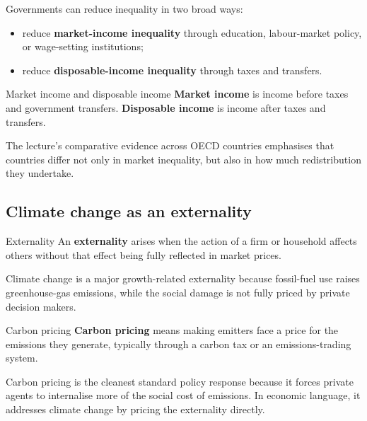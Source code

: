 \documentclass[12pt]{article}
\begin{document}
Governments can reduce inequality in two broad ways:
\begin{itemize}[leftmargin=1.5em]
\item reduce \textbf{market-income inequality} through education, labour-market policy, or wage-setting institutions;
\item reduce \textbf{disposable-income inequality} through taxes and transfers.
\end{itemize}

\begin{definition}{Market income and disposable income}{}
\textbf{Market income} is income before taxes and government transfers.  
\textbf{Disposable income} is income after taxes and transfers.
\end{definition}

The lecture's comparative evidence across OECD countries emphasises that countries differ not only in market inequality, but also in how much redistribution they undertake.

\subsection{Climate change as an externality}

\begin{definition}{Externality}{}
An \textbf{externality} arises when the action of a firm or household affects others without that effect being fully reflected in market prices.
\end{definition}

Climate change is a major growth-related externality because fossil-fuel use raises greenhouse-gas emissions, while the social damage is not fully priced by private decision makers.

\begin{definition}{Carbon pricing}{}
\textbf{Carbon pricing} means making emitters face a price for the emissions they generate, typically through a carbon tax or an emissions-trading system.
\end{definition}

\begin{policynote}[title={Policy Application: Why economists favour carbon pricing}]
Carbon pricing is the cleanest standard policy response because it forces private agents to internalise more of the social cost of emissions. In economic language, it addresses climate change by pricing the externality directly.
\end{policynote}
\end{document}

